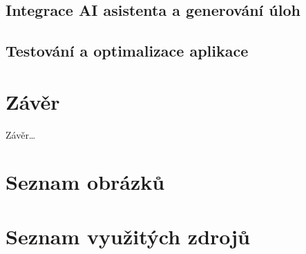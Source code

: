 \documentclass[12pt, a4paper, oneside]{article}
\begin{document}
\subsection{Integrace AI asistenta a generování úloh}
\label{sec:implementace_ai}

\subsection{Testování a optimalizace aplikace}
\label{sec:testovani}


\section{Závěr}
\label{sec:zaver}

Závěr…


\section{Seznam obrázků}
\label{sec:seznam_obrazku}

\makeatletter
{}
\makeatother


\section{Seznam využitých zdrojů}
\label{sec:zdroje}
\end{document}
